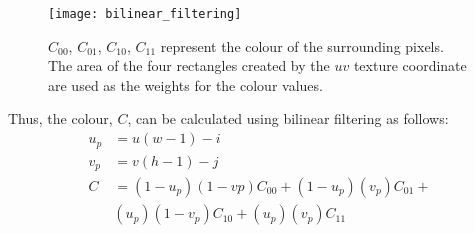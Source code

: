 \begin{figure}[ht]
  \texttt{[image: bilinear\_filtering]}
  \caption{$C_{00}$, $C_{01}$, $C_{10}$, $C_{11}$ represent the colour of the
  surrounding pixels. The area of the four rectangles created by the $uv$ 
  texture coordinate are used as the weights for the colour values.}
  \label{fig:image4}
\end{figure}

Thus, the colour, $C$, can be calculated using bilinear filtering as follows:
\begin{equation}
\begin{split}
  u_{p} &= u(w - 1) - i \\
  v_{p} &= v(h - 1) - j \\
  C &= (1 - u_{p})(1 - v{p})C_{00} + (1 - u_{p})(v_{p})C_{01} + \\
  & (u_{p})(1 - v_{p})C_{10} + (u_{p})(v_{p})C_{11}
\end{split}
\end{equation}

